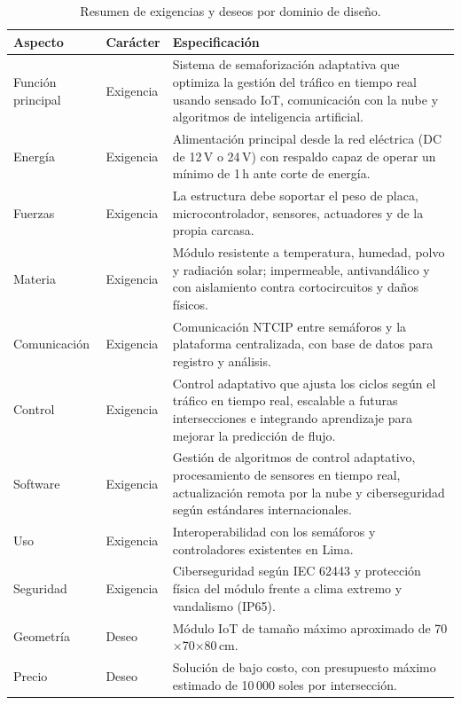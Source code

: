 \begin{table}[H]
  \centering
  \caption{Resumen de exigencias y deseos por dominio de diseño.}
  \label{tab:exigencias}
  \begin{tabularx}{\linewidth}{@{}>{\raggedright\arraybackslash}p{2.6cm}>{\raggedright\arraybackslash}p{1.9cm}>{\raggedright\arraybackslash}X@{}}
    \toprule
    \textbf{Aspecto} & \textbf{Carácter} & \textbf{Especificación}\\
    \midrule
    Función principal & Exigencia & Sistema de semaforización adaptativa que optimiza la gestión del tráfico en
    tiempo real usando sensado IoT, comunicación con la nube y algoritmos de inteligencia artificial.\\
    Energía & Exigencia & Alimentación principal desde la red eléctrica (DC de 12\,V o 24\,V) con respaldo
    capaz de operar un mínimo de 1\,h ante corte de energía.\\
    Fuerzas & Exigencia & La estructura debe soportar el peso de placa, microcontrolador, sensores, actuadores
    y de la propia carcasa.\\
    Materia & Exigencia & Módulo resistente a temperatura, humedad, polvo y radiación solar; impermeable,
    antivandálico y con aislamiento contra cortocircuitos y daños físicos.\\
    Comunicación & Exigencia & Comunicación NTCIP entre semáforos y la plataforma centralizada, con base de
    datos para registro y análisis.\\
    Control & Exigencia & Control adaptativo que ajusta los ciclos según el tráfico en tiempo real, escalable a
    futuras intersecciones e integrando aprendizaje para mejorar la predicción de flujo.\\
    Software & Exigencia & Gestión de algoritmos de control adaptativo, procesamiento de sensores en tiempo
    real, actualización remota por la nube y ciberseguridad según estándares internacionales.\\
    Uso & Exigencia & Interoperabilidad con los semáforos y controladores existentes en Lima.\\
    Seguridad & Exigencia & Ciberseguridad según IEC 62443 y protección física del módulo frente a clima
    extremo y vandalismo (IP65).\\
    Geometría & Deseo & Módulo IoT de tamaño máximo aproximado de 70$\times$70$\times$80\,cm.\\
    Precio & Deseo & Solución de bajo costo, con presupuesto máximo estimado de 10\,000 soles por intersección.\\
    \bottomrule
  \end{tabularx}
\end{table}


